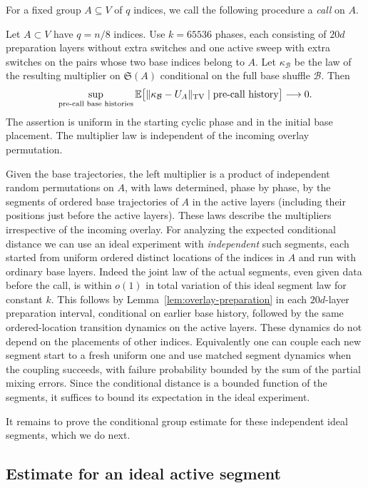 For a fixed group \(A\subseteq V\) of \(q\) indices, we call the following procedure a \emph{call} on \(A\).

\begin{proposition}\label{prop:overlay-call}
Let $A\subset V$ have $q=n/8$ indices. Use $k=65536$ phases, each consisting of $20d$ preparation layers without extra switches and one active sweep with extra switches on the pairs whose two base indices belong to $A$. Let $\kappa_{\mathcal B}$ be the law of the resulting multiplier on $\mathfrak S(A)$ conditional on the full base shuffle $\mathcal B$. Then
\[
 \sup_{\text{pre-call base histories}}
 \mathbb E\big[\|\kappa_{\mathcal B}-U_A\|_{\mathrm{TV}}
          \mid\text{pre-call history}\big]\longrightarrow0.
\]
The assertion is uniform in the starting cyclic phase and in the initial base placement. The multiplier law is independent of the incoming overlay permutation.
\end{proposition}

Given the base trajectories, the left multiplier is a product of independent random permutations on \(A\), with laws determined, phase by phase, by the segments of ordered base trajectories of \(A\) in the active layers (including their positions just before the active layers). These laws describe the multipliers irrespective of the incoming overlay. For analyzing the expected conditional distance we can use an ideal experiment with \emph{independent} such segments, each started from uniform ordered distinct locations of the indices in \(A\) and run with ordinary base layers. Indeed the joint law of the actual segments, even given data before the call, is within \(o(1)\) in total variation of this ideal segment law for constant \(k\). This follows by Lemma~\ref{lem:overlay-preparation} in each \(20d\)-layer preparation interval, conditional on earlier base history, followed by the same ordered-location transition dynamics on the active layers. These dynamics do not depend on the placements of other indices. Equivalently one can couple each new segment start to a fresh uniform one and use matched segment dynamics when the coupling succeeds, with failure probability bounded by the sum of the partial mixing errors. Since the conditional distance is a bounded function of the segments, it suffices to bound its expectation in the ideal experiment.

It remains to prove the conditional group estimate for these independent ideal segments, which we do next.

\subsection{Estimate for an ideal active segment}\label{sec:overlay-ideal}

